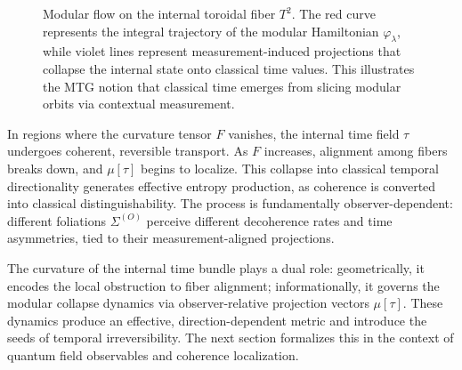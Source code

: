\documentclass[11pt]{article}
\begin{document}
\begin{figure}[!ht]
\centering
{}
\caption{Modular flow on the internal toroidal fiber \( T^2 \). The red curve represents the integral trajectory of the modular Hamiltonian \( \varphi_\lambda \), while violet lines represent measurement-induced projections that collapse the internal state onto classical time values. This illustrates the MTG notion that classical time emerges from slicing modular orbits via contextual measurement.}
\label{fig:modular_flow_torus}
\end{figure}


In regions where the curvature tensor \( F \) vanishes, the internal time field \( \tau \) undergoes coherent, reversible transport. As \( F \) increases, alignment among fibers breaks down, and \( \mu[\tau] \) begins to localize. This collapse into classical temporal directionality generates effective entropy production, as coherence is converted into classical distinguishability. The process is fundamentally observer-dependent: different foliations \( \Sigma^{(O)} \) perceive different decoherence rates and time asymmetries, tied to their measurement-aligned projections.

The curvature of the internal time bundle plays a dual role: geometrically, it encodes the local obstruction to fiber alignment; informationally, it governs the modular collapse dynamics via observer-relative projection vectors \( \mu[\tau] \). These dynamics produce an effective, direction-dependent metric and introduce the seeds of temporal irreversibility. The next section formalizes this in the context of quantum field observables and coherence localization.
\end{document}
